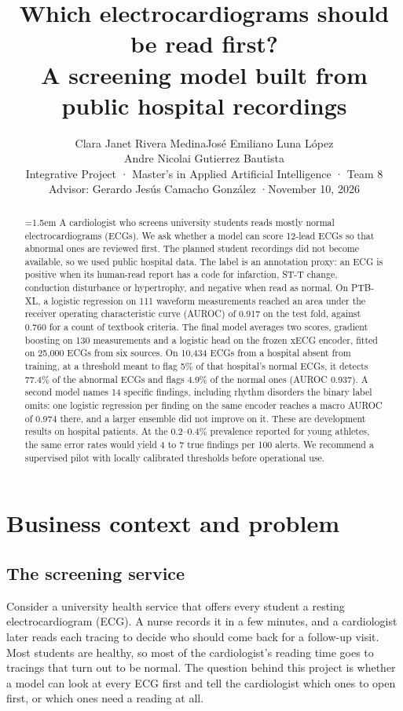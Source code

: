 \documentclass[letterpaper,11pt]{article}
\title{\textbf{Which electrocardiograms should be read first?\\
A screening model built from public hospital recordings}}
\author{Clara Janet Rivera Medina\quad José Emiliano Luna López\\[2pt]
  Andre Nicolai Gutierrez Bautista\\[6pt]
  \normalsize Integrative Project · Master's in Applied Artificial Intelligence · Team 8 \\[6pt]
  \normalsize Advisor: Gerardo Jesús Camacho González \quad·\quad November 10, 2026}
\date{\vspace{-2ex}}
\begin{document}
\maketitle

\begin{abstract}\emergencystretch=1.5em
A cardiologist who screens university students reads mostly normal electrocardiograms (ECGs). We ask whether a model can score 12-lead ECGs so that abnormal ones are reviewed first. The planned student recordings did not become available, so we used public hospital data. The label is an annotation proxy: an ECG is positive when its human-read report has a code for infarction, ST-T change, conduction disturbance or hypertrophy, and negative when read as normal. On PTB-XL, a logistic regression on 111 waveform measurements reached an area under the receiver operating characteristic curve (AUROC) of 0.917 on the test fold, against 0.760 for a count of textbook criteria. The final model averages two scores, gradient boosting on 130 measurements and a logistic head on the frozen xECG encoder, fitted on 25,000 ECGs from six sources. On 10,434 ECGs from a hospital absent from training, at a threshold meant to flag 5\% of that hospital's normal ECGs, it detects 77.4\% of the abnormal ECGs and flags 4.9\% of the normal ones (AUROC 0.937). A second model names 14 specific findings, including rhythm disorders the binary label omits: one logistic regression per finding on the same encoder reaches a macro AUROC of 0.974 there, and a larger ensemble did not improve on it. These are development results on hospital patients. At the 0.2--0.4\% prevalence reported for young athletes, the same error rates would yield 4 to 7 true findings per 100 alerts. We recommend a supervised pilot with locally calibrated thresholds before operational use.
\end{abstract}

\section{Business context and problem}

\subsection{The screening service}

Consider a university health service that offers every student a resting electrocardiogram (ECG). A nurse records it in a few minutes, and a cardiologist later reads each tracing to decide who should come back for a follow-up visit. Most students are healthy, so most of the cardiologist's reading time goes to tracings that turn out to be normal. The question behind this project is whether a model can look at every ECG first and tell the cardiologist which ones to open first, or which ones need a reading at all.
\end{document}
